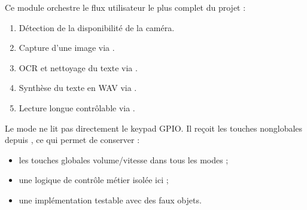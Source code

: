 \documentclass[letterpaper,10pt,french]{sphinxmanual}
\begin{document}
\sphinxAtStartPar
Ce module orchestre le flux utilisateur le plus complet du projet :
\begin{enumerate}
%
\item {} 
\sphinxAtStartPar
Détection de la disponibilité de la caméra.

\item {} 
\sphinxAtStartPar
Capture d’une image via .

\item {} 
\sphinxAtStartPar
OCR et nettoyage du texte via .

\item {} 
\sphinxAtStartPar
Synthèse du texte en WAV via .

\item {} 
\sphinxAtStartPar
Lecture longue contrôlable via .

\end{enumerate}

\sphinxAtStartPar
Le mode ne lit pas directement le keypad GPIO. Il reçoit les touches
non\sphinxhyphen{}globales depuis , ce qui permet de conserver :
\begin{itemize}
\item {} 
\sphinxAtStartPar
les touches globales volume/vitesse dans tous les modes ;

\item {} 
\sphinxAtStartPar
une logique de contrôle métier isolée ici ;

\item {} 
\sphinxAtStartPar
une implémentation testable avec des faux objets.

\end{itemize}
\end{document}
